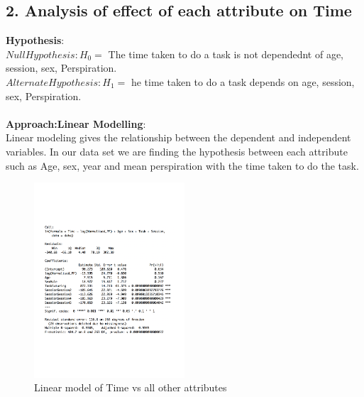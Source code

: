\documentclass[12pt,epsf]{report}
\begin{document}
\subsection*{2. Analysis of effect of each attribute on Time}
\textbf{Hypothesis}:\\
$Null Hypothesis : H_0 = $ The time taken to do a task is not dependednt of age, session, sex, Perspiration.\\
$Alternate Hypothesis : H_1 = $ he time taken to do a task depends on  age, session, sex, Perspiration.\\
\\
\textbf{Approach:Linear Modelling}:\\
Linear modeling gives the relationship between the dependent and independent variables. 
In our data set we are finding the hypothesis between each attribute such as Age, sex, year and mean perspiration with the time taken to do the task.\\
\begin{figure}[!htb]
	\centering
	\includegraphics[width=0.5\textwidth]{TimeSummary.pdf}
	\caption{Linear model of Time vs all other attributes}
	\centering
\end{figure}
\\
\end{document}
